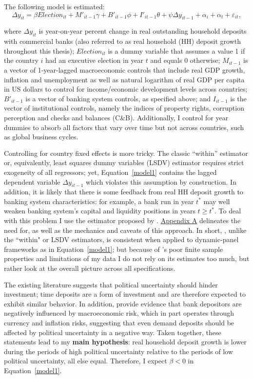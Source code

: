 \documentclass[12pt,a4paper]{article}
\begin{document}
The following model is estimated:
\begin{equation}\label{model1}
\Delta y_{it} = \beta Election_{it} + M'_{it-1}\gamma + B'_{it-1}\phi + I'_{it-1} \theta +\psi \Delta y_{it-1} + \alpha_i + \alpha_t + \varepsilon_{it},
\end{equation}

where $\Delta y_{it}$ is year-on-year percent change in real outstanding household deposits with commercial banks (also referred to as real household (HH) deposit growth throughout this thesis); $Election_{it}$ is a dummy variable that assumes a value 1 if the country $i$ had an executive election in year $t$ and equals 0 otherwise; $M_{it-1}$ is a vector of 1-year-lagged macroeconomic controls that include real GDP growth, inflation and unemployment as well as natural logarithm of real GDP per capita in US dollars to control for income/economic development levels across countries; $B'_{it-1}$ is a vector of banking system controls, as specified above; and $I_{it-1}$ is the vector of institutional controls, namely the indices of property rights, corruption perception and checks and balances (C\&B). Additionally, I control for year dummies to absorb all factors that vary over time but not across countries, such as global business cycles.

Controlling for country fixed effects is more tricky. The classic ``within'' estimator or, equivalently, least squares dummy variables (LSDV) estimator requires strict exogeneity of all regressors; yet, Equation~\eqref{model1} contains the lagged dependent variable $\Delta y_{it-1}$ which violates this assumption by construction. In addition, it is likely that there is some feedback from real HH deposit growth to banking system characteristics: for example, a bank run in year $t^*$ may well weaken banking system's capital and liquidity positions in years $t \geq t^*$. To deal with this problem I use the estimator proposed by \citet{arellano1991some}. \hyperlink{appendixA}{Appendix A} delineates the need for, as well as the mechanics and caveats of this approach.  In short, \citet{arellano1991some}, unlike the ``within" or LSDV estimators, is consistent when applied to dynamic-panel frameworks as in Equation~\eqref{model1}; but because of \citet{arellano1991some}'s poor finite sample properties and limitations of my data I do not rely on its estimates too much, but rather look at the overall picture across all specifications.

The existing literature suggests that political uncertainty should hinder investment; time deposits are a form of investment and are therefore expected to exhibit similar behavior. In addition, \citet{levy2010depositor} provide evidence that bank depositors are negatively influenced by macroeconomic risk, which in part operates through currency and inflation risks, suggesting that even demand deposits should be affected by political uncertainty in a negative way. Taken together, these statements lead to my \textbf{main hypothesis}: real household deposit growth is lower during the periods of high political uncertainty relative to the periods of low political uncertainty, all else equal. Therefore, I expect $\beta < 0$ in Equation~\eqref{model1}.
\end{document}
